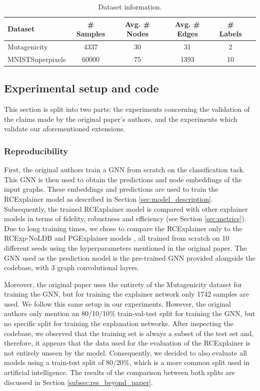 \begin{table}[!htbp]
\caption{Dataset information.}
\centering
\begin{tabular}{lccccc}
\toprule
Dataset & \# Samples & Avg. \# Nodes & Avg. \# Edges & \# Labels \\
\midrule
Mutagenicity & 4337 & 30 & 31 & 2 \\
MNISTSuperpixels & 60000 & 75 & 1393 & 10 \\
\bottomrule
\end{tabular}
\label{table:datasets}
\end{table}

\subsection{Experimental setup and code}
This section is split into two parts: the experiments concerning the validation of the claims made by the original paper's authors, and the experiments which validate our aforementioned extensions.

\subsubsection{Reproducibility}
\label{subsec:reproducibility}
First, the original authors train a GNN from scratch on the classification task. This GNN is then used to obtain the predictions and node embeddings of the input graphs. These embeddings and predictions are used to train the RCExplainer model as described in Section \ref{sec:model_description}. Subsequently, the trained RCExplainer model is compared with other explainer models in terms of fidelity, robustness and efficiency (see Section \ref{sec:metrics}). Due to long training times, we chose to compare the RCExplainer only to the RCExp-NoLDB \cite{bajaj2021robust} and PGExplainer models \cite{luo2020parameterized}, all trained from scratch on 10 different seeds using the hyperparameters mentioned in the original paper. The GNN used as the prediction model is the pre-trained GNN provided alongside the codebase, with 3 graph convolutional layers.

Moreover, the original paper uses the entirety of the Mutagenicity dataset for training the GNN, but for training the explainer network only 1742 samples are used. We follow this same setup in our experiments. However, the original authors only mention an 80/10/10\% train-val-test split for training the GNN, but no specific split for training the explanation networks. After inspecting the codebase, we observed that the training set is always a subset of the test set and, therefore, it appears that the data used for the evaluation of the RCExplainer is not entirely unseen by the model. Consequently, we decided to also evaluate all models using a train-test split of 80/20\%, which is a more common split used in artificial intelligence. The results of the comparison between both splits are discussed in Section \ref{subsec:res_beyond_paper}.

